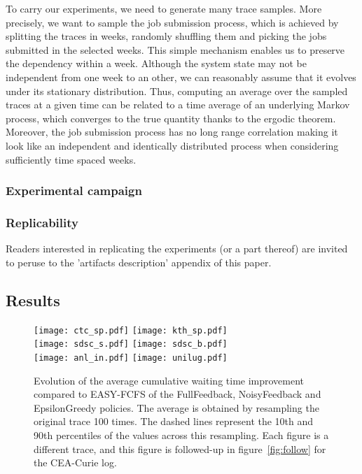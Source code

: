 \documentclass[sigconf]{acmart}
\begin{document}
To carry our experiments, we need to generate many trace samples. More precisely, we want
to sample the job submission process, which is achieved by splitting the traces in weeks,
randomly shuffling them and picking the jobs submitted in the selected weeks.  This simple
mechanism enables us to preserve the dependency within a week. Although the system state
may not be independent from one week to an other, we can reasonably assume that it evolves
under its stationary distribution. Thus, computing an average over the sampled traces at a
given time can be related to a time average of an underlying Markov process, which
converges to the true quantity thanks to the ergodic theorem.  Moreover, the job
submission process has no long range correlation making it look like an independent and
identically distributed process when considering sufficiently time spaced weeks.

\subsubsection{Experimental campaign}

\subsubsection{Replicability}

Readers interested in replicating the experiments (or a part thereof) are
invited to peruse to the 'artifacts description' appendix of this paper.

\subsection{Results}
\label{sub:results}

\begin{figure*}[ht]
  \centering
  \texttt{[image: ctc\_sp.pdf]}
  \texttt{[image: kth\_sp.pdf]}\\
  \texttt{[image: sdsc\_s.pdf]}
  \texttt{[image: sdsc\_b.pdf]}\\
  \texttt{[image: anl\_in.pdf]}
  \texttt{[image: unilug.pdf]}

  \caption{Evolution of the average cumulative waiting time improvement
    compared to EASY-FCFS of the FullFeedback, NoisyFeedback and EpsilonGreedy
    policies. The average is obtained by resampling the original trace 100
    times. The dashed lines represent the 10th and 90th percentiles of the
  values across this resampling. Each figure is a different trace, and this
figure is followed-up in figure~\ref{fig:follow} for the CEA-Curie log.}

  \label{fig:small}
\end{figure*}
\end{document}
